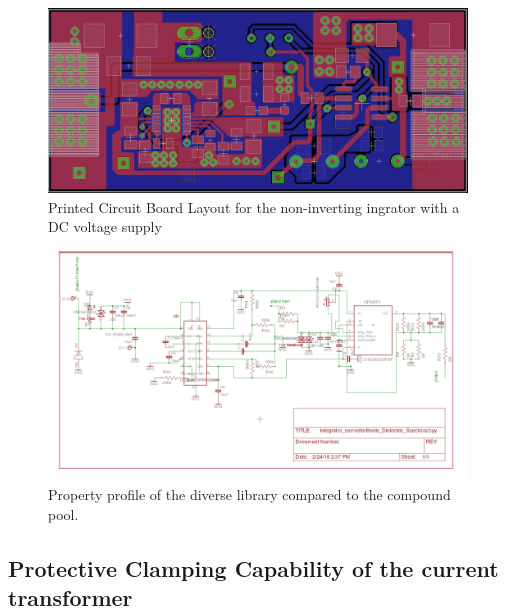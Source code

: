 \begin{figure}
\includegraphics[width=0.99\textwidth]{figures/Method/integrator/PCB_Integrator.png}
    \caption{Printed Circuit Board Layout for the non-inverting ingrator with a DC voltage supply}
    
    \end{figure}	
    
    
    \newpage
    
    	\begin{figure}
\includegraphics[width=0.99\textwidth]{figures/Method/integrator/schematic.jpg}
 \caption{Property profile of the diverse library compared to the compound pool.}
  \end{figure}	

	



\subsection{Protective Clamping Capability of the current transformer}
\label{clamping}

